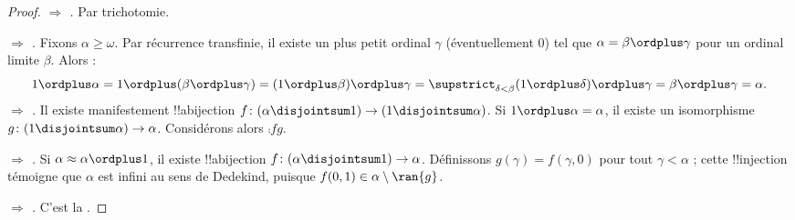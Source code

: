\documentclass[../../../include/open-logic-section]{subfiles}
\begin{document}
\begin{proof}
\emph{ $\Rightarrow$
.} Par trichotomie.

\emph{ $\Rightarrow$
.} Fixons
$\alpha \geq \omega$. Par récurrence transfinie,
il existe un plus petit ordinal $\gamma$
(éventuellement $0$) tel que
$\alpha = \beta \ordplus \gamma$
pour un ordinal limite $\beta$. Alors :
\[
	1 \ordplus \alpha =
	1 \ordplus (\beta \ordplus \gamma) =
	(1 \ordplus \beta) \ordplus \gamma =
	\supstrict_{\delta < \beta}
	(1 \ordplus \delta) \ordplus \gamma =
	\beta \ordplus \gamma =
	\alpha.
\]
\emph{ $\Rightarrow$
.} Il existe manifestement
!!a{bijection}
$f \colon (\alpha \disjointsum 1) \to
(1 \disjointsum \alpha)$. Si
$1 \ordplus \alpha = \alpha$, il existe un
isomorphisme
$g \colon (1 \disjointsum \alpha) \to \alpha$.
Considérons alors $\comp{f}{g}$.

\emph{ $\Rightarrow$
.} Si
$\alpha \approx \alpha \ordplus 1$,
il existe !!a{bijection}
$f \colon (\alpha \disjointsum 1) \to \alpha$.
Définissons $g(\gamma) = f(\gamma, 0)$
pour tout $\gamma < \alpha$ ; cette
!!{injection} témoigne que $\alpha$ est
infini au sens de Dedekind, puisque
$f(0,1) \in \alpha \setminus \ran{g}$.

\emph{ $\Rightarrow$
.} C'est
la .
\end{proof}
\end{document}

